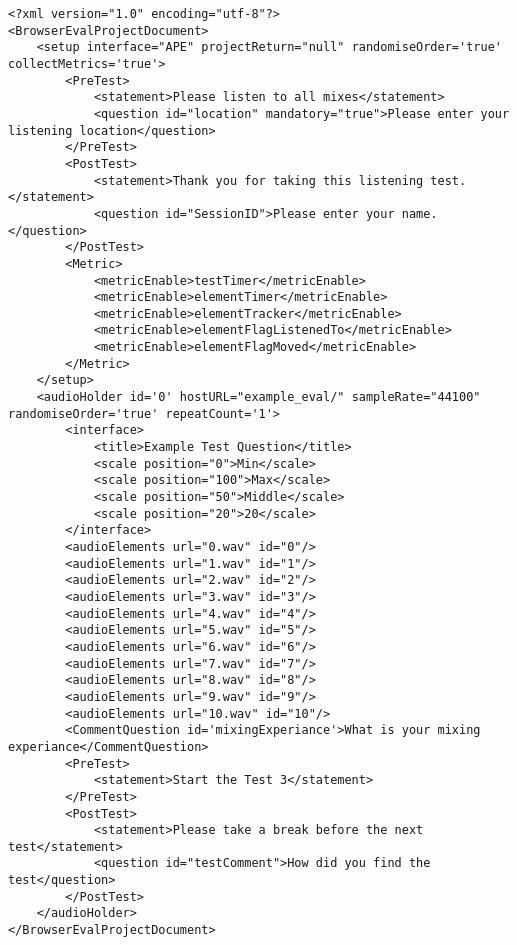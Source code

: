 \documentclass{article}
\begin{document}
\begin{lstlisting}
<?xml version="1.0" encoding="utf-8"?>
<BrowserEvalProjectDocument>
	<setup interface="APE" projectReturn="null" randomiseOrder='true' collectMetrics='true'>
		<PreTest>
			<statement>Please listen to all mixes</statement>
			<question id="location" mandatory="true">Please enter your listening location</question>
		</PreTest>
		<PostTest>
			<statement>Thank you for taking this listening test.</statement>
			<question id="SessionID">Please enter your name.</question>
		</PostTest>
		<Metric>
			<metricEnable>testTimer</metricEnable>
			<metricEnable>elementTimer</metricEnable>
			<metricEnable>elementTracker</metricEnable>
			<metricEnable>elementFlagListenedTo</metricEnable>
			<metricEnable>elementFlagMoved</metricEnable>
		</Metric>
	</setup>
	<audioHolder id='0' hostURL="example_eval/" sampleRate="44100" randomiseOrder='true' repeatCount='1'>
		<interface>
			<title>Example Test Question</title>
			<scale position="0">Min</scale>
			<scale position="100">Max</scale>
			<scale position="50">Middle</scale>
			<scale position="20">20</scale>
		</interface>
		<audioElements url="0.wav" id="0"/>
		<audioElements url="1.wav" id="1"/>
		<audioElements url="2.wav" id="2"/>
		<audioElements url="3.wav" id="3"/>
		<audioElements url="4.wav" id="4"/>
		<audioElements url="5.wav" id="5"/>
		<audioElements url="6.wav" id="6"/>
		<audioElements url="7.wav" id="7"/>
		<audioElements url="8.wav" id="8"/>
		<audioElements url="9.wav" id="9"/>
		<audioElements url="10.wav" id="10"/>
		<CommentQuestion id='mixingExperiance'>What is your mixing experiance</CommentQuestion>
		<PreTest>
			<statement>Start the Test 3</statement>
		</PreTest>
		<PostTest>
			<statement>Please take a break before the next test</statement>
			<question id="testComment">How did you find the test</question>
		</PostTest>
	</audioHolder>
</BrowserEvalProjectDocument>
\end{lstlisting}
\end{document}
